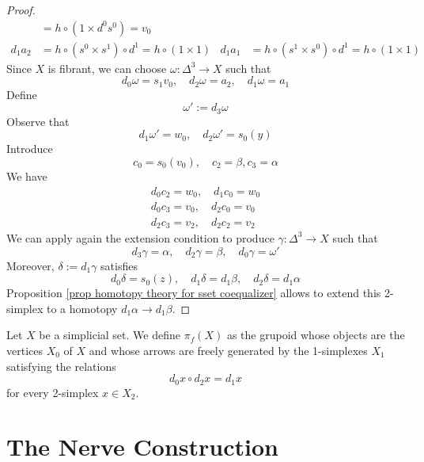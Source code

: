 \begin{proof}
\begin{align*}
& = h \circ (1 \times d^0 s^0) = v_0 \\
d_1 a_2 & = h \circ (s^0 \times s^1) \circ d^1 = h \circ (1 \times 1) & d_1 a_1 & = h \circ (s^1 \times s^0) \circ d^1 = h \circ (1 \times 1)
\end{align*}
Since $X$ is fibrant, we can choose $\omega \colon \Delta^3 \to X$ such that
\[
d_0 \omega = s_1 v_0, \quad d_2 \omega = a_2, \quad d_1 \omega = a_1
\]
Define
\[
\omega' := d_3 \omega
\]
Observe that
\[
d_1 \omega' = w_0, \quad d_2 \omega' = s_0(y)
\]
Introduce
\[
c_0 = s_0(v_0), \quad c_2 = \beta, c_3 = \alpha
\]
We have
\begin{gather*}
d_0 c_2 = w_0, \quad d_1 c_0 = w_0 \\
d_0 c_3 = v_0, \quad d_2 c_0 = v_0 \\
d_2 c_3 = v_2, \quad d_2 c_2 = v_2
\end{gather*}
We can apply again the extension condition to produce $\gamma \colon \Delta^3 \to X$ such that
\[
d_3 \gamma = \alpha, \quad d_2 \gamma = \beta, \quad d_0 \gamma = \omega'
\]
Moreover, $\delta := d_1 \gamma$ satisfies
\[
d_0 \delta = s_0(z), \quad d_1 \delta = d_1 \beta, \quad d_2 \delta = d_1 \alpha
\]
Proposition \ref{prop homotopy theory for sset coequalizer} allows to extend this 2-simplex to a homotopy $d_1 \alpha \to d_1 \beta$.
\end{proof}

\begin{defin}
Let $X$ be a simplicial set. We define $\pi_f(X)$ as the grupoid whose objects are the vertices $X_0$ of $X$ and whose arrows are freely generated by the 1-simplexes $X_1$ satisfying the relations
\[
d_0 x \circ d_2 x = d_1 x
\]
for every 2-simplex $x \in X_2$.
\end{defin}



\section{The Nerve Construction}
